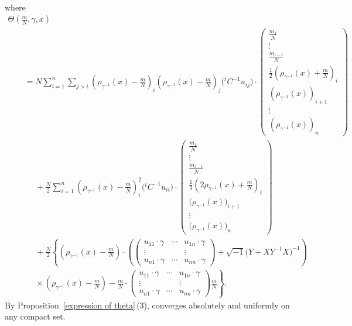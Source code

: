 \documentclass[pdftex]{sigma}
\numberwithin{equation}{section}
\begin{document}
\begin{Example}
\begin{align*}
\end{align*}
where
\begin{gather*}
\Theta \left(\frac{m}{N}, \gamma, x\right)
\\
\qquad=N\sum_{i=1}^n\sum_{j>i}\left( \rho_{\gamma^{-1}}(x)-\frac{m}{N}\right)_i \left( \rho_{\gamma^{-1}}(x)-\frac{m}{N}\right)_j\bigl( {}^tC^{-1}u_{ij}\bigr)\cdot
\begin{pmatrix}
\frac{m_1}{N} \\
\vdots \\
\frac{m_{i-1}}{N} \\
\frac{1}{2}\left( \rho_{\gamma^{-1}}(x)+\frac{m}{N}\right)_i \\
\left( \rho_{\gamma^{-1}}(x)\right)_{i+1} \\
\vdots \\
\left( \rho_{\gamma^{-1}}(x)\right)_n
\end{pmatrix}\\
\phantom{\qquad=}{} +\frac{N}{2}\sum_{i=1}^n\left( \rho_{\gamma^{-1}}(x)-\frac{m}{N}\right)_i^2\bigl( {}^tC^{-1}u_{ii}\bigr)\cdot
\begin{pmatrix}
\frac{m_1}{N} \\
\vdots \\
\frac{m_{i-1}}{N} \\
\frac{1}{3}\left(2\rho_{\gamma^{-1}}(x)+\frac{m}{N}\right)_i \\
\bigl( \rho_{\gamma^{-1}}(x)\bigr)_{i+1} \\
\vdots \\
\bigl( \rho_{\gamma^{-1}}(x)\bigr)_n
\end{pmatrix}\\
\phantom{\qquad=}{} + \frac{N}{2} \left\{\left( \rho_{\gamma^{-1}}(x)-\frac{m}{N}\right) \cdot \left(
\begin{pmatrix}
u_{11}\cdot \gamma & \cdots & u_{1n}\cdot \gamma \\
\vdots & & \vdots \\
u_{n1}\cdot \gamma & \cdots & u_{nn}\cdot \gamma
\end{pmatrix}
+ \sqrt{-1}\bigl(Y+XY^{-1}X\bigr)^{-1} \right)\right.\\
\left.\phantom{\qquad=}{}\times
\left( \rho_{\gamma^{-1}}(x)-\frac{m}{N}\right) - \frac{m}{N}\cdot
\begin{pmatrix}
u_{11}\cdot \gamma & \cdots & u_{1n}\cdot \gamma \\
\vdots & & \vdots \\
u_{n1}\cdot \gamma & \cdots & u_{nn}\cdot \gamma
\end{pmatrix}
\frac{m}{N}\right\}.
\end{gather*}
By Proposition~\ref{expression of theta}\,(3),  converges absolutely and uniformly on any compact set.
\end{Example}
\end{document}
